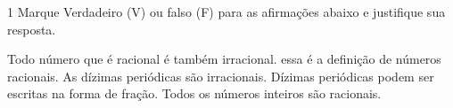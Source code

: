 
\num{1} Marque Verdadeiro (V) ou falso (F) para as afirmações abaixo e
justifique sua resposta.


\begin{boxlist}
 Todo número que é racional é também irracional.
essa é a definição de números racionais.
 As dízimas periódicas são irracionais.
 Dízimas periódicas podem ser escritas na forma de fração.
 Todos os números inteiros são racionais.~

\end{boxlist}

